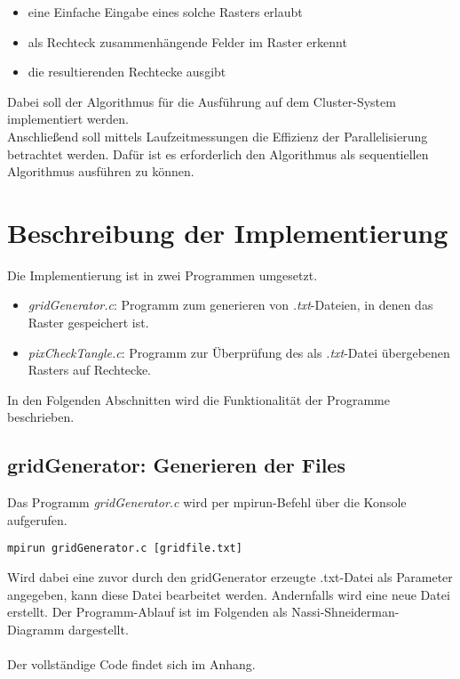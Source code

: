 \documentclass[
10pt, %
a4paper, %
oneside, %
headinclude,footinclude, %
BCOR5mm, %
]{scrartcl}
\begin{document}
\begin{itemize}[noitemsep] %
	\item eine Einfache Eingabe eines solche Rasters erlaubt
	\item als Rechteck zusammenhängende Felder im Raster erkennt 
	\item die resultierenden Rechtecke ausgibt
\end{itemize}

Dabei soll der Algorithmus für die Ausführung auf dem Cluster-System implementiert werden.\\
Anschließend soll mittels Laufzeitmessungen die Effizienz der Parallelisierung betrachtet werden. Dafür ist es erforderlich den Algorithmus als sequentiellen Algorithmus ausführen zu können.

\section{Beschreibung der Implementierung}

Die Implementierung ist in zwei Programmen umgesetzt. 

\begin{itemize}[noitemsep] %
	\item \textit{gridGenerator.c}: Programm zum generieren von \textit{.txt}-Dateien, in denen das Raster gespeichert ist.  
	\item \textit{pixCheckTangle.c}: Programm zur Überprüfung des als \textit{.txt}-Datei übergebenen Rasters auf Rechtecke.
\end{itemize}

In den Folgenden Abschnitten wird die Funktionalität der Programme beschrieben.

\subsection{gridGenerator: Generieren der Files}

Das Programm \textit{gridGenerator.c} wird per mpirun-Befehl über die Konsole aufgerufen.\\

\begin{lstlisting}
mpirun gridGenerator.c [gridfile.txt]
\end{lstlisting}

Wird dabei eine zuvor durch den gridGenerator erzeugte .txt-Datei als Parameter angegeben, kann diese Datei bearbeitet werden. Andernfalls wird eine neue Datei erstellt. Der Programm-Ablauf ist im Folgenden als Nassi-Shneiderman-Diagramm dargestellt.\\
\\Der vollständige Code findet sich im Anhang. 
\pagebreak
\end{document}
